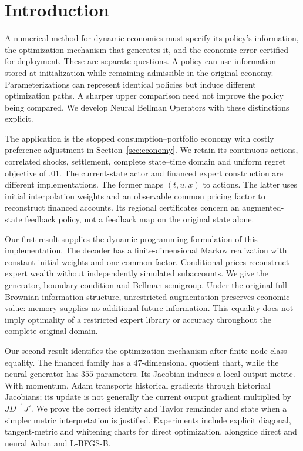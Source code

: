 \section{Introduction}\label{sec:r24intro}
A numerical method for dynamic economics must specify its policy's information, the optimization mechanism that generates it, and the economic error certified for deployment. These are separate questions. A policy can use information stored at initialization while remaining admissible in the original economy. Parameterizations can represent identical policies but induce different optimization paths. A sharper upper comparison need not improve the policy being compared. We develop Neural Bellman Operators with these distinctions explicit.

The application is the stopped consumption--portfolio economy with costly preference adjustment in Section~\ref{sec:economy}. We retain its continuous actions, correlated shocks, settlement, complete state--time domain and uniform regret objective of $.01$. The current-state actor and financed expert construction are different implementations. The former maps $(t,u,x)$ to actions. The latter uses initial interpolation weights and an observable common pricing factor to reconstruct financed accounts. Its regional certificates concern an augmented-state feedback policy, not a feedback map on the original state alone.

Our first result supplies the dynamic-programming formulation of this implementation. The decoder has a finite-dimensional Markov realization with constant initial weights and one common factor. Conditional prices reconstruct expert wealth without independently simulated subaccounts. We give the generator, boundary condition and Bellman semigroup. Under the original full Brownian information structure, unrestricted augmentation preserves economic value: memory supplies no additional future information. This equality does not imply optimality of a restricted expert library or accuracy throughout the complete original domain.

Our second result identifies the optimization mechanism after finite-node class equality. The financed family has a $47$-dimensional quotient chart, while the neural generator has $355$ parameters. Its Jacobian induces a local output metric. With momentum, Adam transports historical gradients through historical Jacobians; its update is not generally the current output gradient multiplied by $JD^{-1}J'$. We prove the correct identity and Taylor remainder and state when a simpler metric interpretation is justified. Experiments include explicit diagonal, tangent-metric and whitening charts for direct optimization, alongside direct and neural Adam and L-BFGS-B.

